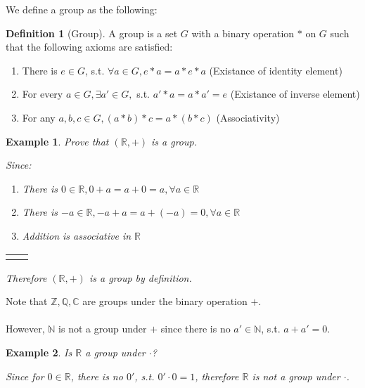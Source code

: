 \documentclass{article}
\theoremstyle{MyNonumberplain}
\theoremstyle{break}
\newcommand{\R}{\mathbb{R}}
\newcommand{\Q}{\mathbb{Q}}
\newcommand{\Z}{\mathbb{Z}}
\newcommand{\N}{\mathbb{N}}
\newcommand{\C}{\mathbb{C}}
\theoremstyle{break}
\newtheorem{example}{Example}[section]
\theoremstyle{break}
\theoremstyle{definition}
\theoremstyle{break}
\newtheorem{definition}{Definition}[section]
\begin{document}
We define a group as the following:

\begin{defbox}
    \begin{definition}[Group]
        A group is a set $G$ with a binary operation $*$ on $G$ such that the following axioms are satisfied:\\
        \begin{enumerate}
            \item There is $e\in G$, s.t. $\forall a\in G, e*a=a*e*a$ (Existance of identity element)
            \item For every $a\in G,\exists a'\in G,$ s.t. $a'*a=a*a'=e$ (Existance of inverse element)
            \item For any $a,b,c\in G, (a*b)*c=a*(b*c)$ (Associativity)
        \end{enumerate}
    \end{definition}
\end{defbox}

\begin{expbox}
    \begin{example}
        Prove that $(\R,+)$ is a group.

\begin{ansbox}
    Since: \\
    \begin{enumerate}       
        \item There is $0\in\R,0+a=a+0=a,\forall a\in\R$
        \item There is $-a\in\R,-a+a=a+(-a)=0,\forall a\in\R$
        \item Addition is associative in $\R$
    \end{enumerate}
    \begin{tabular}{ll}
        &\\
    \end{tabular}
    
    Therefore $(\R,+)$ is a group by definition.
\end{ansbox}
    \end{example}
\end{expbox}

Note that $\Z,\Q,\C$ are groups under the binary operation $+$.\\\\
However, $\N$ is not a group under $+$ since there is no $a'\in\N$, s.t. $a+a'=0$.

\begin{expbox}
    \begin{example}
        Is $\R$ a group under $\cdot$?
        \begin{ansbox}
            Since for $0\in\R$, there is no $0'$, s.t. $0'\cdot 0=1$, therefore $\R$ is not a group under $\cdot$.
        \end{ansbox}
    \end{example}
\end{expbox}
\end{document}

